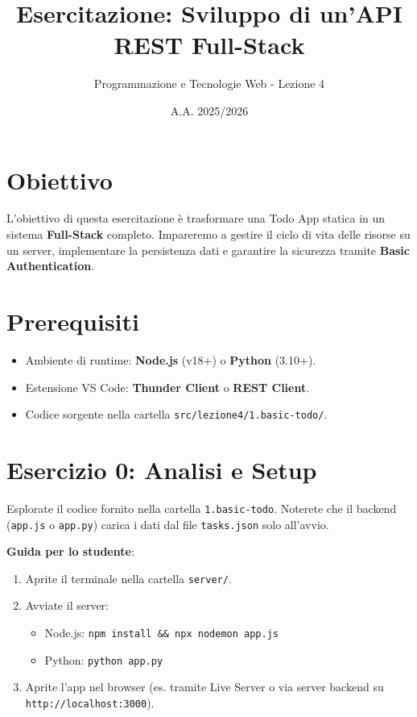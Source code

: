 \documentclass[11pt,a4paper]{article}
\title{\textbf{\color{primary} Esercitazione: Sviluppo di un'API REST Full-Stack}}
\author{Programmazione e Tecnologie Web - Lezione 4}
\date{A.A. 2025/2026}
\begin{document}
\maketitle

\section{Obiettivo}
L'obiettivo di questa esercitazione è trasformare una Todo App statica in un sistema \textbf{Full-Stack} completo. Impareremo a gestire il ciclo di vita delle risorse su un server, implementare la persistenza dati e garantire la sicurezza tramite \textbf{Basic Authentication}.

\section{Prerequisiti}
\begin{itemize}
    \item Ambiente di runtime: \textbf{Node.js} (v18+) o \textbf{Python} (3.10+).
    \item Estensione VS Code: \textbf{Thunder Client} o \textbf{REST Client}.
    \item Codice sorgente nella cartella \texttt{src/lezione4/1.basic-todo/}.
\end{itemize}

\section{Esercizio 0: Analisi e Setup}
Esplorate il codice fornito nella cartella \texttt{1.basic-todo}. Noterete che il backend (\texttt{app.js} o \texttt{app.py}) carica i dati dal file \texttt{tasks.json} solo all'avvio.

\textbf{Guida per lo studente}:
\begin{enumerate}
    \item Aprite il terminale nella cartella \texttt{server/}.
    \item Avviate il server:
    \begin{itemize}
        \item Node.js: \texttt{npm install \&\& npx nodemon app.js}
        \item Python: \texttt{python app.py}
    \end{itemize}
    \item Aprite l'app nel browser (es. tramite Live Server o via server backend su \texttt{http://localhost:3000}).
\end{enumerate}
\end{document}
